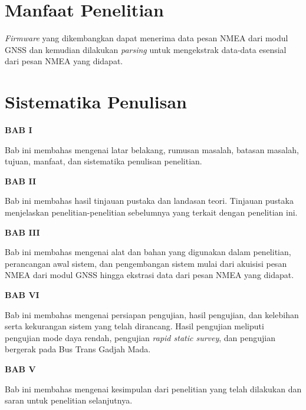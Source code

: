 \section{Manfaat Penelitian}
\textit{Firmware} yang dikembangkan dapat menerima data pesan NMEA dari modul GNSS dan kemudian dilakukan \textit{parsing} untuk mengekstrak data-data esensial dari pesan NMEA yang didapat.

\section{Sistematika Penulisan}
\textbf{BAB I}

Bab ini membahas mengenai latar belakang, rumusan masalah, batasan masalah, tujuan, manfaat, dan sistematika penulisan penelitian.

\textbf{BAB II}

Bab ini membahas hasil tinjauan pustaka dan landasan teori. Tinjauan pustaka menjelaskan penelitian-penelitian sebelumnya yang terkait dengan penelitian ini.

\textbf{BAB III}

Bab ini membahas mengenai alat dan bahan yang digunakan dalam penelitian, perancangan awal sistem, dan pengembangan sistem mulai dari akuisisi pesan NMEA dari modul GNSS hingga ekstrasi data dari pesan NMEA yang didapat.

\textbf{BAB VI}

Bab ini membahas mengenai persiapan pengujian, hasil pengujian, dan kelebihan serta kekurangan sistem yang telah dirancang. Hasil pengujian meliputi pengujian mode daya rendah, pengujian \textit{rapid static survey}, dan pengujian bergerak pada Bus Trans Gadjah Mada.

\textbf{BAB V}

Bab ini membahas mengenai kesimpulan dari penelitian yang telah dilakukan dan saran untuk penelitian selanjutnya.